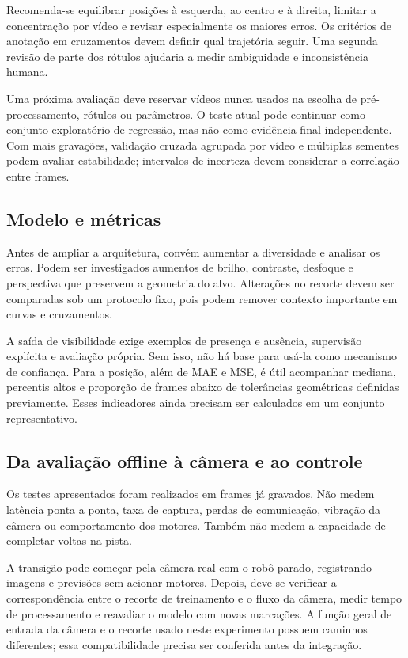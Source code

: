 \documentclass[a4paper,oneside,11pt]{article}
\begin{document}
Recomenda-se equilibrar posições à esquerda, ao centro e à direita, limitar a concentração por vídeo e revisar especialmente os maiores erros. Os critérios de anotação em cruzamentos devem definir qual trajetória seguir. Uma segunda revisão de parte dos rótulos ajudaria a medir ambiguidade e inconsistência humana.

Uma próxima avaliação deve reservar vídeos nunca usados na escolha de pré-processamento, rótulos ou parâmetros. O teste atual pode continuar como conjunto exploratório de regressão, mas não como evidência final independente. Com mais gravações, validação cruzada agrupada por vídeo e múltiplas sementes podem avaliar estabilidade; intervalos de incerteza devem considerar a correlação entre frames.

\subsection{Modelo e métricas}
Antes de ampliar a arquitetura, convém aumentar a diversidade e analisar os erros. Podem ser investigados aumentos de brilho, contraste, desfoque e perspectiva que preservem a geometria do alvo. Alterações no recorte devem ser comparadas sob um protocolo fixo, pois podem remover contexto importante em curvas e cruzamentos.

A saída de visibilidade exige exemplos de presença e ausência, supervisão explícita e avaliação própria. Sem isso, não há base para usá-la como mecanismo de confiança. Para a posição, além de MAE e MSE, é útil acompanhar mediana, percentis altos e proporção de frames abaixo de tolerâncias geométricas definidas previamente. Esses indicadores ainda precisam ser calculados em um conjunto representativo.

\subsection{Da avaliação offline à câmera e ao controle}
Os testes apresentados foram realizados em frames já gravados. Não medem latência ponta a ponta, taxa de captura, perdas de comunicação, vibração da câmera ou comportamento dos motores. Também não medem a capacidade de completar voltas na pista.

A transição pode começar pela câmera real com o robô parado, registrando imagens e previsões sem acionar motores. Depois, deve-se verificar a correspondência entre o recorte de treinamento e o fluxo da câmera, medir tempo de processamento e reavaliar o modelo com novas marcações. A função geral de entrada da câmera e o recorte usado neste experimento possuem caminhos diferentes; essa compatibilidade precisa ser conferida antes da integração.
\end{document}

